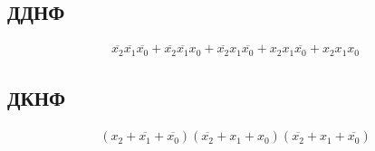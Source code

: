 \documentclass{article}
\begin{document}
\begin{normalsize}
	\subsection*{ДДНФ}
	\begin{Large}
		\begin{gather}
			\overline{x_2}\overline{x_1}\overline{x_0}+\overline{x_2}\overline{x_1}x_0+\overline{x_2}x_1\overline{x_0}+x_2x_1\overline{x_0}+x_2x_1x_0	\nonumber
		\end{gather}
	\end{Large}

	\subsection*{ДКНФ}
	\begin{Large}
		\begin{gather}
			(x_2+\overline{x_1}+\overline{x_0})(\overline{x_2}+x_1+x_0)(\overline{x_2}+x_1+\overline{x_0})			\nonumber
		\end{gather}
	\end{Large}


\end{normalsize}
\end{document}

